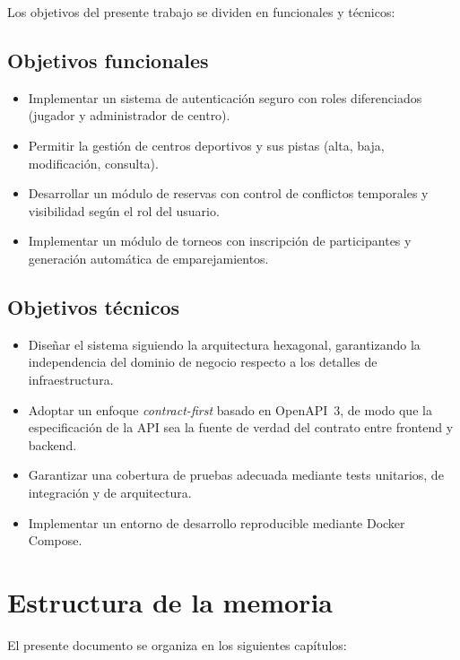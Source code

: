 Los objetivos del presente trabajo se dividen en funcionales y técnicos:

\subsection{Objetivos funcionales}

\begin{itemize}
  \item Implementar un sistema de autenticación seguro con roles diferenciados
        (jugador y administrador de centro).
  \item Permitir la gestión de centros deportivos y sus pistas (alta, baja,
        modificación, consulta).
  \item Desarrollar un módulo de reservas con control de conflictos temporales
        y visibilidad según el rol del usuario.
  \item Implementar un módulo de torneos con inscripción de participantes y
        generación automática de emparejamientos.
\end{itemize}

\subsection{Objetivos técnicos}

\begin{itemize}
  \item Diseñar el sistema siguiendo la arquitectura hexagonal, garantizando
        la independencia del dominio de negocio respecto a los detalles de
        infraestructura.
  \item Adoptar un enfoque \textit{contract-first} basado en OpenAPI~3, de modo
        que la especificación de la API sea la fuente de verdad del contrato
        entre frontend y backend.
  \item Garantizar una cobertura de pruebas adecuada mediante tests unitarios,
        de integración y de arquitectura.
  \item Implementar un entorno de desarrollo reproducible mediante Docker Compose.
\end{itemize}

\section{Estructura de la memoria}
\label{sec:estructura}

El presente documento se organiza en los siguientes capítulos:

